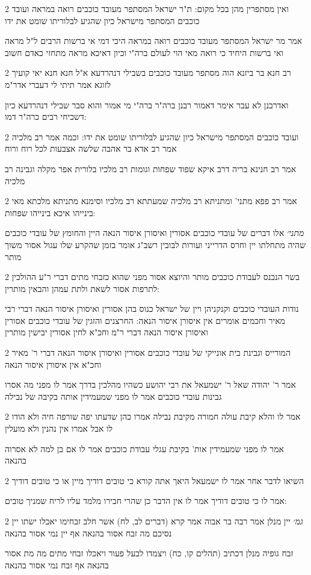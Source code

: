 \documentclass[12pt, openany]{book}
\newcommand{\sethebfont}{
\fontsize{10.5pt}{21.0pt} \selectfont
}
\newcommand{\twocol}[1]{
	{\sethebfont \begin{multicols}{2}
			#1
	\end{multicols}}	
}
\begin{document}
\twocol{ואין מסתפרין מהן בכל מקום: ת"ר ישראל המסתפר מעובד כוכבים רואה במראה ועובד כוכבים המסתפר מישראל כיון שהגיע לבלוריתו שומט את ידו
\par אמר מר ישראל המסתפר מעובד כוכבים רואה במראה היכי דמי אי ברשות הרבים ל"ל מראה ואי ברשות היחיד כי רואה מאי הוי לעולם ברה"י וכיון דאיכא מראה מתחזי כאדם חשוב}
\twocol{רב חנא בר ביזנא הוה מסתפר מעובד כוכבים בשבילי דנהרדעא א"ל חנא חנא יאי קועיך לזוגא אמר תיתי לי דעברי אדר"מ
\par ואדרבנן לא עבר אימר דאמור רבנן ברה"ר ברה"י מי אמור והוא סבר שבילי דנהרדעא כיון דשכיחי רבים כרה"ר דמו:}
\twocol{ועובד כוכבים המסתפר מישראל כיון שהגיע לבלוריתו שומט את ידו: וכמה אמר רב מלכיה אמר רב אדא בר אהבה שלשה אצבעות לכל רוח ורוח
\par אמר רב חנינא בריה דרב איקא שפוד שפחות וגומות רב מלכיו בלורית אפר מקלה וגבינה רב מלכיה}
\twocol{אמר רב פפא מתני' ומתניתא רב מלכיה שמעתתא רב מלכיו וסימנא מתניתא מלכתא מאי בינייהו איכא בינייהו שפחות:
\par {\large\emph{מתני׳}} אלו דברים של עובדי כוכבים אסורין ואיסורן איסור הנאה היין והחומץ של עובדי כוכבים שהיה מתחלתו יין וחרס הדרייני ועורות לבובין רשב"ג אומר בזמן שהקרע שלו עגול אסור משוך מותר}
\twocol{בשר הנכנס לעבודת כוכבים מותר והיוצא אסור מפני שהוא כזבחי מתים דברי ר"ע ההולכין לתרפות אסור לשאת ולתת עמהן והבאין מותרין:
\par נודות העובדי כוכבים וקנקניהן ויין של ישראל כנוס בהן אסורין ואיסורן איסור הנאה דברי רבי מאיר וחכמים אומרים אין איסורן איסור הנאה: החרצנים והזגין של עובדי כוכבים אסורין ואיסורן איסור הנאה דברי ר"מ וחכ"א לחין אסורין יבישין מותרין}
\twocol{המורייס וגבינת בית אונייקי של עובדי כוכבים אסורין ואיסורן איסור הנאה דברי ר' מאיר וחכ"א אין איסורן איסור הנאה
\par אמר ר' יהודה שאל ר' ישמעאל את רבי יהושע כשהיו מהלכין בדרך אמר לו מפני מה אסרו גבינות עובדי כוכבים אמר לו מפני שמעמידין אותה בקיבה של נבילה}
\twocol{אמר לו והלא קיבת עולה חמורה מקיבת נבילה אמרו כהן שדעתו יפה שורפה חיה ולא הודו לו אבל אמרו אין נהנין ולא מועלין
\par אמר לו מפני שמעמידין אות' בקיבת עגלי עבודת כוכבים אמר לו אם כן למה לא אסרוה בהנאה}
\twocol{השיאו לדבר אחר אמר לו ישמעאל היאך אתה קורא כי טובים דודיך מיין או כי טובים דודיך
\par אמר לו כי טובים דודיך אמר לו אין הדבר כן שהרי חבירו מלמד עליו לריח שמניך טובים:}
\twocol{{\large\emph{גמ׳}} יין מנלן אמר רבה בר אבוה אמר קרא (דברים לב, לח) אשר חלב זבחימו יאכלו ישתו יין נסיכם מה זבח אסור בהנאה אף יין נמי אסור בהנאה
\par זבח גופיה מנלן דכתיב (תהלים קו, כח) ויצמדו לבעל פעור ויאכלו זבחי מתים מה מת אסור בהנאה אף זבח נמי אסור בהנאה}
\end{document}
